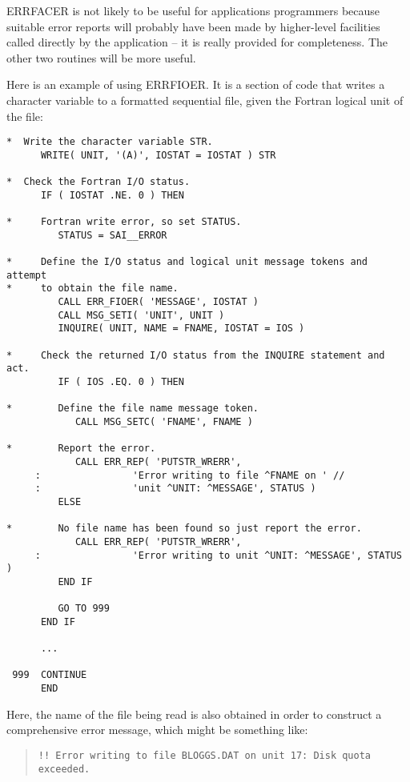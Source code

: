 \documentclass[twoside,11pt]{article}
\renewcommand{\_}{\texttt{\symbol{95}}}
\begin{document}
ERR\_FACER is not likely to be useful for applications programmers because
suitable error reports will probably have been made by higher-level facilities 
called directly by the application -- it is really provided for completeness.
The other two routines will be more useful.

Here is an example of using ERR\_FIOER. 
It is a section of code that writes a character variable to a formatted 
sequential file, given the Fortran logical unit of the file: 

\begin {small}
\begin{verbatim}
*  Write the character variable STR.
      WRITE( UNIT, '(A)', IOSTAT = IOSTAT ) STR

*  Check the Fortran I/O status.
      IF ( IOSTAT .NE. 0 ) THEN

*     Fortran write error, so set STATUS.
         STATUS = SAI__ERROR

*     Define the I/O status and logical unit message tokens and attempt 
*     to obtain the file name.
         CALL ERR_FIOER( 'MESSAGE', IOSTAT )
         CALL MSG_SETI( 'UNIT', UNIT )
         INQUIRE( UNIT, NAME = FNAME, IOSTAT = IOS )

*     Check the returned I/O status from the INQUIRE statement and act.
         IF ( IOS .EQ. 0 ) THEN

*        Define the file name message token.
            CALL MSG_SETC( 'FNAME', FNAME )

*        Report the error.
            CALL ERR_REP( 'PUTSTR_WRERR',
     :                'Error writing to file ^FNAME on ' //
     :                'unit ^UNIT: ^MESSAGE', STATUS )
         ELSE

*        No file name has been found so just report the error.
            CALL ERR_REP( 'PUTSTR_WRERR',
     :                'Error writing to unit ^UNIT: ^MESSAGE', STATUS )
         END IF

         GO TO 999
      END IF

      ...

 999  CONTINUE
      END
\end{verbatim}
\end {small}

Here, the name of the file being read is also obtained in order to construct 
a comprehensive error message, which might be something like:

\begin {quote}
\begin {small}
\begin{verbatim}
!! Error writing to file BLOGGS.DAT on unit 17: Disk quota exceeded.
\end{verbatim}
\end {small}
\end {quote}
\end{document}
